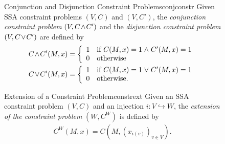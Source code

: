 \begin{figure}[p]
    \begin{definition}{Conjunction and Disjunction Constraint Problems}{conjconstr}
        Given SSA constraint problems $(V,C)$ and $(V,C')$, the
        {\it conjunction constraint problem}
        $(V,C\hspace{-0.5mm}\land\hspace{-0.5mm}C')$ and the
        {\it disjunction constraint problem}
        $(V,C\hspace{-0.5mm}\lor\hspace{-0.5mm}C')$ are defined by
        \begin{align*}
            &C\hspace{-0.5mm}\land\hspace{-0.5mm}C'(M,x)=\left\{
                \begin{array}{l}
                    1\text{\quad if }C(M,x)=1\mathrel\land C'(M,x)=1\\
                    0\text{\quad otherwise}
                \end{array}\right.\\
            &C\hspace{-0.5mm}\lor\hspace{-0.5mm}C'(M,x)=\left\{
                \begin{array}{l}
                    1\text{\quad if }C(M,x)=1\mathrel\lor C'(M,x)=1\\
                    0\text{\quad otherwise}.
                \end{array}\right.
        \end{align*}
    \end{definition}

    \begin{definition}{Extension of a Constraint Problem}{constrext}
        Given an SSA constraint problem $(V,C)$ and an injection
        $i:V\hookrightarrow W$, the
        {\it extension of the constraint problem} $(W,C^W)$ is defined by
        \begin{align*}
            C^W(M,x)=C\left(M,\left(x_{i(v)}\right)_{v\in V}\right).
        \end{align*}
    \end{definition}
\end{figure}

\begin{figure}[p]
    
\end{figure}

\begin{figure}[p]
    
\end{figure}


